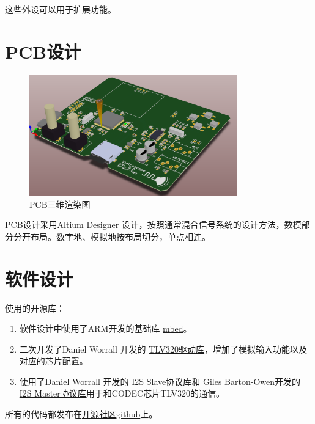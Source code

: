 \documentclass[16pt,a4paper]{article}
\begin{document}
这些外设可以用于扩展功能。

\section{PCB设计}
\begin{figure}[H]
\centering
\includegraphics[width=0.8\textwidth]{pcb3D.png}
\caption{PCB三维渲染图} 
\end{figure}
PCB设计采用Altium Designer 设计，按照通常混合信号系统的设计方法，数模部分分开布局。数字地、模拟地按布局切分，单点相连。


\section{软件设计}
使用的开源库：
\begin{enumerate}
\item 软件设计中使用了ARM开发的基础库 \href{https://developer.mbed.org/users/mbed_official/code/mbed/}{mbed}。
\item 二次开发了Daniel Worrall 开发的 \href{https://developer.mbed.org/cookbook/TLV320AIC23B}{TLV320驱动库}，增加了模拟输入功能以及对应的芯片配置。
\item 使用了Daniel Worrall 开发的 \href{https://developer.mbed.org/users/d_worrall/code/I2SSlave/}{I2S Slave协议库}和 Giles Barton-Owen开发的 \href{https://developer.mbed.org/users/p07gbar/code/I2S/}{I2S Master协议库}用于和CODEC芯片TLV320的通信。
\end{enumerate}
所有的代码都发布在\href{https://github.com/gjc13/Stethoscope}{开源社区github}上。
\end{document}
